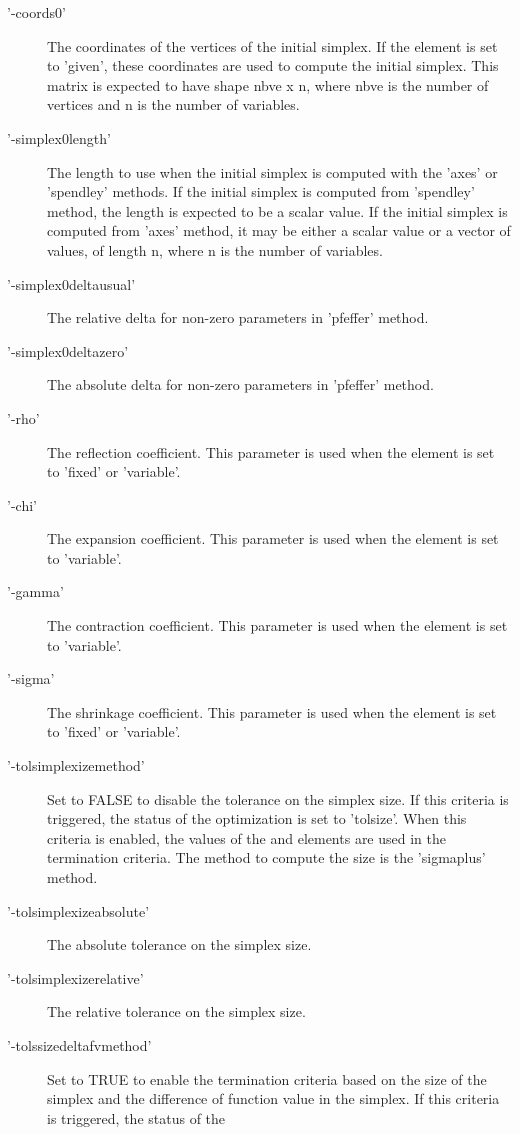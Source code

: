 \begin{Details}
\begin{description}
\item['-coords0'] The coordinates of the vertices of the initial simplex. If
the  element is set to 'given', these coordinates are
used to compute the initial simplex. This matrix is expected to have shape
nbve x n, where nbve is the number of vertices and n is the number of
variables.
\item['-simplex0length'] The length to use when the initial simplex is
computed with the 'axes' or 'spendley' methods. If the initial simplex is
computed from 'spendley' method, the length is expected to be a
scalar value. If the initial simplex is computed from 'axes' method,
it may be either a scalar value or a vector of values, of length n,
where n is the number of variables.
\item['-simplex0deltausual'] The relative delta for non-zero parameters in
'pfeffer' method.
\item['-simplex0deltazero'] The absolute delta for non-zero parameters in
'pfeffer' method.
\item['-rho'] The reflection coefficient. This parameter is used when the
 element is set to 'fixed' or 'variable'.
\item['-chi'] The expansion coefficient. This parameter is used when the
 element is set to 'variable'.
\item['-gamma'] The contraction coefficient. This parameter is used when the
 element is set to 'variable'.
\item['-sigma'] The shrinkage coefficient. This parameter is used when the
 element is set to 'fixed' or 'variable'.
\item['-tolsimplexizemethod'] Set to FALSE to disable the tolerance on the
simplex size. If this criteria is triggered,
the status of the optimization is set to 'tolsize'. When this criteria is
enabled, the values of the  and
 elements are used in the termination
criteria. The method to compute the size is the 'sigmaplus' method.
\item['-tolsimplexizeabsolute'] The absolute tolerance on the simplex size.
\item['-tolsimplexizerelative'] The relative tolerance on the simplex size.
\item['-tolssizedeltafvmethod'] Set to TRUE to enable the termination
criteria based on the size of the simplex and the difference of function
value in the simplex. If this criteria is triggered, the status of the

\end{description}
\end{Details}
